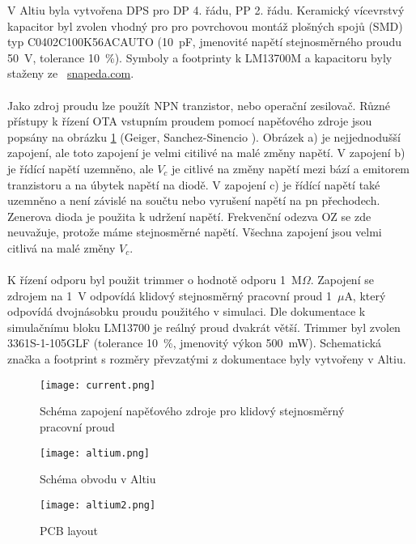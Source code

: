 \noindent V Altiu byla vytvořena DPS pro DP 4. řádu, PP 2. řádu. Keramický vícevrstvý kapacitor byl zvolen vhodný pro pro povrchovou montáž plošných spojů (SMD) typ C0402C100K56ACAUTO (10~pF, jmenovité napětí stejnosměrného proudu 50~V, tolerance 10~\%). Symboly a footprinty k LM13700M a kapacitoru byly staženy ze~ \url{snapeda.com}. \\
\\
Jako zdroj proudu lze použít NPN tranzistor, nebo operační zesilovač. Různé přístupy k řízení OTA vstupním proudem pomocí napěťového zdroje jsou popsány na obrázku \ref{s:DC} (Geiger, Sanchez-Sinencio \cite{25}). Obrázek a) je nejjednodušší zapojení, ale toto zapojení je velmi citilivé na malé změny napětí. V zapojení b) je řídící napětí uzemněno, ale $V_c$ je citlivé na změny napětí mezi bází a emitorem tranzistoru a na úbytek napětí na diodě. V zapojení c) je řídící napětí také uzemněno a není závislé na součtu nebo vyrušení napětí na pn přechodech. Zenerova dioda je použita k udržení napětí. Frekvenční odezva OZ se zde neuvažuje, protože máme stejnosměrné napětí. Všechna zapojení jsou velmi citlivá na malé změny $V_c$. \\
\\
K řízení odporu byl použit trimmer o hodnotě odporu 1~M$\Omega$. Zapojení se zdrojem na 1~V odpovídá klidový stejnosměrný pracovní proud 1~$\mu$A, který odpovídá dvojnásobku proudu použitého v simulaci. Dle dokumentace k simulačnímu bloku LM13700 je reálný proud dvakrát větší. Trimmer byl zvolen 3361S-1-105GLF (tolerance 10~\%, jmenovitý výkon 500~mW). Schematická značka a footprint s rozměry převzatými z dokumentace byly vytvořeny v Altiu.
\begin{figure}[h]
\centering
\texttt{[image: current.png]}
\caption{Schéma zapojení napěťového zdroje pro klidový stejnosměrný pracovní proud \label{s:DC}}
\end{figure}
\begin{figure}[h]
\centering
\texttt{[image: altium.png]}
\caption{Schéma obvodu v Altiu}
\end{figure}
\begin{figure}[h]
\centering
\texttt{[image: altium2.png]}
\caption{PCB layout}
\end{figure}